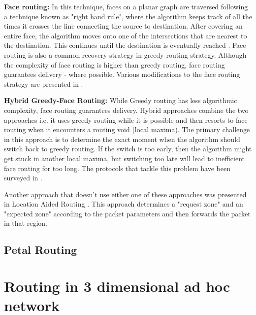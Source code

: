 \textbf{Face routing:} In this technique, faces on a planar graph are traversed following a technique known as "right hand rule", where the algorithm keeps track of all the times it crosses the line connecting the source to destination. After covering an entire face, the algorithm moves onto one of the intersections that are nearest to the destination. This continues until the destination is eventually reached \cite{4448977} \cite{6238283}. Face routing is also a common recovery strategy in greedy routing strategy. Although the complexity of face routing is higher than greedy routing, face routing guarantees delivery - where possible. Various modifications to the face routing strategy are presented in \cite{6238283}.

\textbf{Hybrid Greedy-Face Routing:} While Greedy routing has less algorithmic complexity, face routing guarantees delivery. Hybrid approaches combine the two approaches i.e. it uses greedy routing while it is possible and then resorts to face routing when it encounters a routing void (local maxima). The primary challenge in this approach is to determine the exact moment when the algorithm should switch back to greedy routing. If the switch is too early, then the algorithm might get stuck in another local maxima, but switching too late will lead to inefficient face routing for too long. The protocols that tackle this problem have been surveyed in \cite{6238283}.

Another approach that doesn't use either one of these approaches was presented in Location Aided Routing \cite{Ko:1998:LRM:288235.288252}. This approach determines a "request zone" and an "expected zone" according to the packet parameters and then forwards the packet in that region.
\subsection{Petal Routing}

\section{Routing in 3 dimensional ad hoc network}
